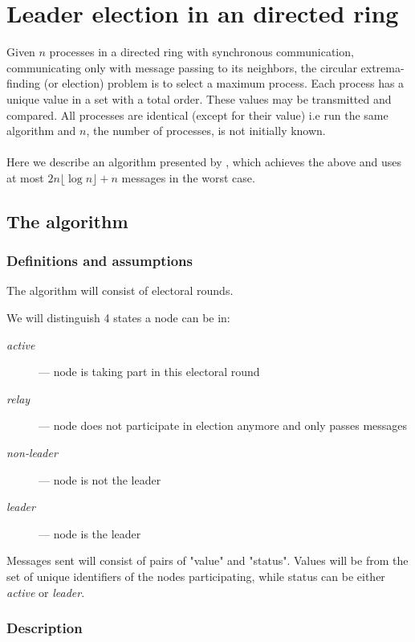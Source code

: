 \documentclass{article}
\begin{document}
\section*{Leader election in an directed ring}

Given $n$ processes in a directed ring with synchronous communication, communicating only with message passing to its neighbors, the circular extrema-finding (or election) problem is to select a maximum process. Each process has a unique value in a set with a total order. These values may be transmitted and compared. All processes are identical (except for their value) i.e run the same algorithm and $n$, the number of processes, is not initially known.

\paragraph{}
Here we describe an algorithm presented by \cite{10.1145/69622.357194}, which achieves the above and uses at most $2 n \lfloor{}\log n\rfloor{} + n$ messages in the worst case.
\subsection*{The algorithm}
\subsubsection*{Definitions and assumptions}
The algorithm will consist of electoral rounds.

We will distinguish 4 states a node can be in:
\begin{description}

\item[\textit{active}] --- node is taking part in this electoral round
\item[\textit{relay}] --- node does not participate in election anymore and only passes messages
\item[\textit{non-leader}] --- node is not the leader
\item[\textit{leader}] --- node is the leader

\end{description}

Messages sent will consist of pairs of "value" and "status". Values will be from the set of unique identifiers of the nodes participating, while status can be either \textit{active} or \textit{leader}.

\subsubsection*{Description}
\end{document}
